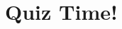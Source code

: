 \documentclass{beamer}
\begin{document}
\begin{frame}





\end{frame}

\section{Quiz Time!}
\end{document}
